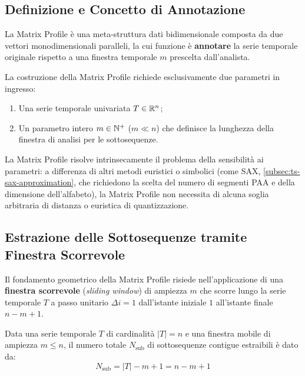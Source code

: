 \FloatBarrier
\subsection{Definizione e Concetto di Annotazione}
\label{subsec:ts-mp-concept}

La Matrix Profile \`e una meta-struttura dati bidimensionale composta da due vettori monodimensionali paralleli, la cui funzione \`e \textbf{annotare} la serie temporale originale rispetto a una finestra temporale $m$ prescelta dall'analista.

\begin{definition}
\label{def:mp-inputs}
La costruzione della Matrix Profile richiede esclusivamente due parametri in ingresso:
\begin{enumerate}
    \item Una serie temporale univariata $T \in \mathbb{R}^n$;
    \item Un parametro intero $m \in \mathbb{N}^+$ ($m \ll n$) che definisce la lunghezza della finestra di analisi per le sottosequenze.
\end{enumerate}
\end{definition}

La Matrix Profile risolve intrinsecamente il problema della sensibilit\`a ai parametri: a differenza di altri metodi euristici o simbolici (come SAX, \autoref{subsec:ts-sax-approximation}, che richiedono la scelta del numero di segmenti PAA e della dimensione dell'alfabeto), la Matrix Profile non necessita di alcuna soglia arbitraria di distanza o euristica di quantizzazione.

\FloatBarrier
\subsection{Estrazione delle Sottosequenze tramite Finestra Scorrevole}
\label{subsec:ts-sliding-window}

Il fondamento geometrico della Matrix Profile risiede nell'applicazione di una \textbf{finestra scorrevole} (\textit{sliding window}) di ampiezza $m$ che scorre lungo la serie temporale $T$ a passo unitario $\Delta i = 1$ dall'istante iniziale $1$ all'istante finale $n - m + 1$.

\begin{proposition}
\label{prop:num-subsequences}
Data una serie temporale $T$ di cardinalit\`a $|T| = n$ e una finestra mobile di ampiezza $m \le n$, il numero totale $N_{\text{sub}}$ di sottosequenze contigue estraibili \`e dato da:
\begin{equation}
\label{eq:n-subsequences}
N_{\text{sub}} = |T| - m + 1 = n - m + 1
\end{equation}
\end{proposition}

